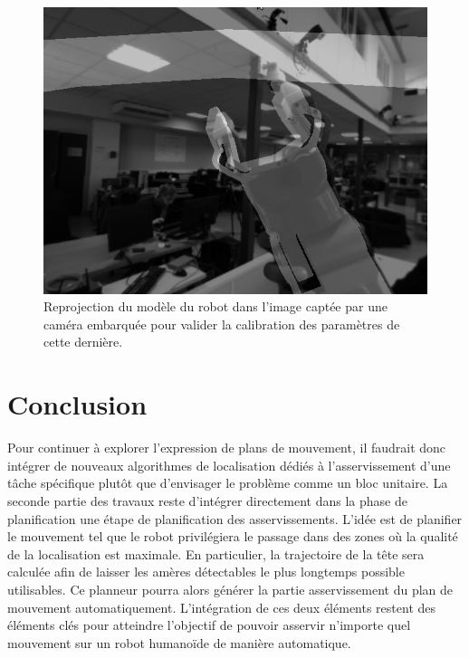 \begin{figure}
  \begin{center}
    \includegraphics[width=.95\linewidth]{src/chap3-primitive-mouvement/calibextrinsic.jpg}
  \end{center}
  \caption{Reprojection du modèle du robot dans l'image captée par une
    caméra embarquée pour valider la calibration des paramètres de
    cette dernière.}
\end{figure}


\section{Conclusion}

Pour continuer à explorer l'expression de plans de mouvement, il
faudrait donc intégrer de nouveaux algorithmes de localisation dédiés
à l'asservissement d'une tâche spécifique plutôt que d'envisager le
problème comme un bloc unitaire. La seconde partie des travaux reste
d'intégrer directement dans la phase de planification une étape de
planification des asservissements. L'idée est de planifier le
mouvement tel que le robot privilégiera le passage dans des zones où
la qualité de la localisation est maximale. En particulier, la
trajectoire de la tête sera calculée afin de laisser les amères
détectables le plus longtemps possible utilisables. Ce planneur pourra
alors générer la partie asservissement du plan de mouvement
automatiquement. L'intégration de ces deux éléments restent des
éléments clés pour atteindre l'objectif de pouvoir asservir n'importe
quel mouvement sur un robot humanoïde de manière automatique.
